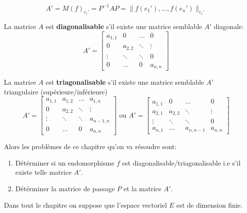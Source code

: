  \[
     A' = M(f)_{e_i'} = P^{-1}AP = \|f(e_1'), \ldots, f(e_n')\|_{e_i'}
\] 
\begin{definition}\label{def:matrice-diagonalisable}
    La matrice $A$ est \textbf{diagonalisable} s'il existe une matrice semblable  $A'$ diagonale:
     \[
         A' = 
         \begin{bmatrix} 
         a_{1,1} & 0 & \ldots & 0 \\
         0 & a_{2,2} & \ddots & \vdots\\
         \vdots & \ddots & \ddots & 0\\
         0 & \ldots & 0 & a_{n,n}
        \end{bmatrix} 
    \] 
\end{definition}
\begin{definition}
    La matrice $A$ est \textbf{triagonalisable} s'il existe une matrice semblable  $A'$ triangulaire (supérieure/inférieure) 
     \[
         A' = 
         \begin{bmatrix} 
         a_{1,1} & a_{1,2} & \ldots & a_{1,n} \\
         0 & a_{2,2} & \ddots & \vdots\\
         \vdots & \ddots & \ddots & a_{n-1,n}\\
         0 & \ldots & 0 & a_{n,n}
        \end{bmatrix} \text{ ou } 
         A' = 
         \begin{bmatrix} 
         a_{1,1} & 0 & \ldots & 0 \\
         a_{2, 1} & a_{2,2} & \ddots & \vdots\\
         \vdots & \ddots & \ddots & 0\\
         a_{n, 1} & \ldots & a_{n, n-1} & a_{n,n}
        \end{bmatrix} 
    \] 
\end{definition}
Alors les problèmes de ce chapitre qu'on va résoudre sont:
\begin{enumerate}
    \item Détérminer si un endomorphisme $f$ est diagonalisable/triagonalisable i.e s'il existe telle matrice  $A'$.
    \item Détérminer la matrice de passage $P$ et la matrice $A'$.
\end{enumerate}
Dans tout le chapitre on suppose que l'espace vectoriel $E$ est de dimension finie.
